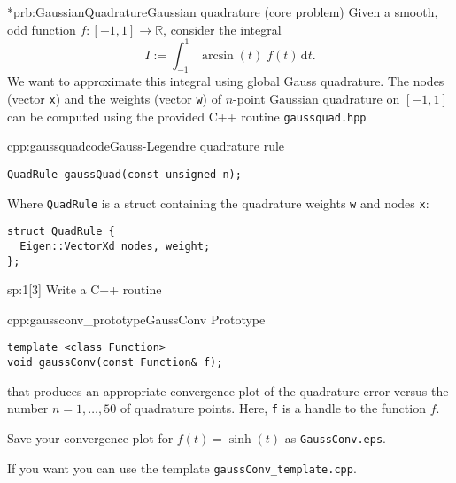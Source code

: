 
\begin{samproblem}*{prb:GaussianQuadrature}{Gaussian quadrature (core problem)}{
  Given a smooth, odd function $f:[-1,1]\rightarrow \mathbb{R}$, consider the integral
  \begin{equation}
  \label{eq:GaussianQuadrature_IntArcsin}
    I := \int_{-1}^{1} \arcsin(t) \; f(t) \,\mathrm{d}t.
  \end{equation}
  We want to approximate this integral using global Gauss quadrature.
  The nodes (vector \texttt{x}) and the weights (vector \texttt{w}) of $n$-point Gaussian quadrature on $[-1,1]$ 
  can be computed using the provided C++ routine \texttt{gaussquad.hpp}
}

\begin{samcode}[C++-code]{cpp:gaussquadcode}{Gauss-Legendre quadrature rule}
  \begin{lstlisting}[style=cpp]
QuadRule gaussQuad(const unsigned n);
  \end{lstlisting}
  Where \texttt{QuadRule} is a struct containing the quadrature weights \texttt{w} and nodes \texttt{x}:
  \begin{lstlisting}[style=cpp]
struct QuadRule {
  Eigen::VectorXd nodes, weight;
};
  \end{lstlisting}
\end{samcode}


\begin{subproblem}{sp:1}[3]
  Write a C++ routine
  \begin{samcode}[C++-code]{cpp:gaussconv_prototype}{GaussConv Prototype}
    \begin{lstlisting}[style=cpp]
template <class Function>
void gaussConv(const Function& f);
    \end{lstlisting}
  \end{samcode}
  that produces an appropriate convergence plot of the quadrature error versus the
  number $n=1,\ldots,50$ of quadrature points. Here, \texttt{f} is a handle to the function $f$.

  Save your convergence plot for $f(t)=\sinh(t)$ as \texttt{GaussConv.eps}.
  
  \begin{samhint}
    If you want you can use the template \texttt{gaussConv_template.cpp}. 
  \end{samhint}


\end{subproblem}
\end{samproblem}
